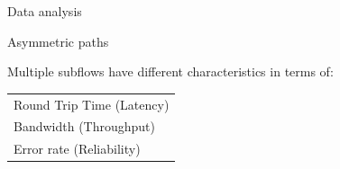 \documentclass{beamer}
\begin{document}
\begin{frame}{Data analysis}
  \vspace{-0.5cm}
  \begin{table}[]
    \caption{\footnotesize Statistics about destination port, \textcolor{uos-grey-full}{Source:~\cite{realMPTCP}}}
  \end{table}

\end{frame}



\begin{frame}{Asymmetric paths}

  \begin{center}
    \Large \color{uos-red-full} Multiple subflows have different characteristics in terms of:
  \end{center}
  \vspace{0.5cm}


  \begin{table}
    \centering
    \begin{tabular}{@{}l@{}}
      \large\tabitem{} Round Trip Time (Latency) \\[10pt]
      \large\tabitem{} Bandwidth (Throughput)    \\[10pt]
      \large\tabitem{} Error rate (Reliability)
    \end{tabular}
  \end{table}
\end{frame}
\end{document}
